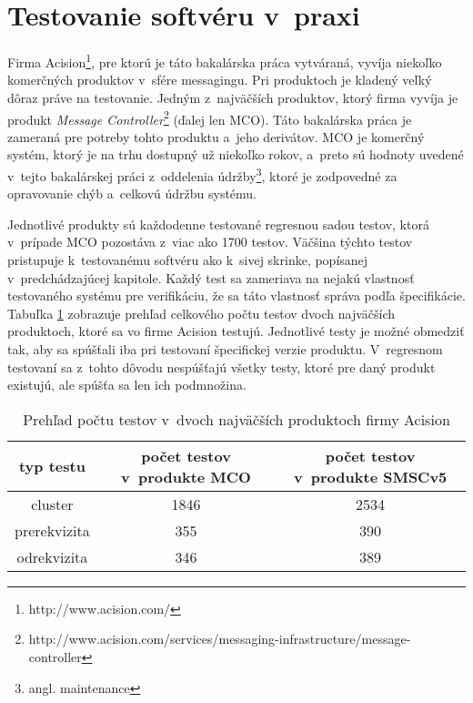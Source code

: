 \section{Testovanie softvéru v~praxi} 
\label{sekcia:testovanie_v_praxi}
Firma Acision\footnote{http://www.acision.com/}, pre ktorú je táto 
bakalárska práca vytváraná, vyvíja niekoľko komerčných produktov
v~sfére messagingu. 
Pri produktoch je kladený veľký dôraz práve na testovanie.
Jedným z~najväčších produktov, ktorý firma vyvíja je produkt 
\textit{Message Controller}\footnote{http://www.acision.com/services/messaging-infrastructure/message-controller}
(ďalej len MCO).
Táto bakalárska práca je zameraná pre potreby tohto produktu a~jeho 
derivátov. MCO je komerčný systém, ktorý je na trhu dostupný už niekoľko 
rokov, a~preto sú hodnoty uvedené v~tejto bakalárskej práci z~oddelenia 
údržby\footnote{angl. maintenance}, ktoré je zodpovedné za opravovanie 
chýb a~celkovú údržbu systému.

Jednotlivé produkty sú každodenne testované regresnou 
sadou testov, ktorá v~prípade MCO pozostáva z~viac ako 1700 testov.
Väčšina týchto testov pristupuje k~testovanému softvéru ako k~sivej 
skrinke, popísanej v~predchádzajúcej kapitole.
Každý test sa zameriava na nejakú vlastnosť testovaného systému pre 
verifikáciu, že sa táto vlastnosť správa podľa špecifikácie.
Tabuľka \ref{tabulka:pocet_testov} zobrazuje prehľad celkového počtu 
testov dvoch najväčších produktoch, ktoré sa vo firme Acision testujú.
Jednotlivé testy je možné obmedziť tak, aby sa spúšťali iba pri testovaní
špecifickej verzie produktu. 
V~regresnom testovaní sa z~tohto dôvodu nespúšťajú všetky testy, 
ktoré pre daný produkt existujú, ale spúšťa sa len ich podmnožina.

\begin{table}
  \begin{center}
    \begin{tabular}{| c | c | c |}
    \hline
    typ testu & počet testov v~produkte MCO & počet testov v~produkte SMSCv5 \\ \hline
    cluster & 1846 & 2534 \\ \hline
    prerekvizita & 355 & 390 \\ \hline
    odrekvizita & 346 & 389 \\
    \hline
    \end{tabular}
    \caption{Prehľad počtu testov v~dvoch najväčších 
             produktoch firmy Acision}
    \label{tabulka:pocet_testov}
  \end{center}
\end{table}


